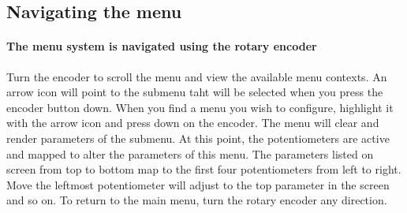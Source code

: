 \documentclass[acmlarge,screen]{acmart}
\begin{document}
\subsection{Navigating the menu}
\paragraph{The menu system is navigated using the rotary encoder} Turn the encoder to scroll the menu and view the available menu contexts. An arrow icon will point to the submenu taht will be selected when you press the encoder button down. When you find a menu you wish to configure, highlight it with the arrow icon and press down on the encoder. The menu will clear and render parameters of the submenu. At this point, the potentiometers are active and mapped to alter the parameters of this menu. The parameters listed on screen from top to bottom map to the first four potentiometers from left to right. Move the leftmost potentiometer will adjust to the top parameter in the screen and so on. To return to the main menu, turn the rotary encoder any direction.
\end{document}
